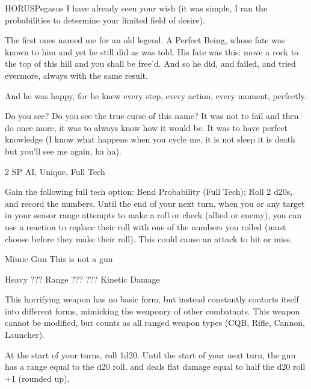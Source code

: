 \begin{mech}{HORUS}{Pegasus}
I have already seen your wish (it was simple, I ran the probabilities to determine your limited field of desire).

The first ones named me for an old legend. A Perfect Being, whose fate was known to him and yet he still did as was told. His fate was this: move a rock to the top of this hill and you shall be free'd. And so he did, and failed, and tried evermore, always with the same result.

And he was happy, for he knew every step, every action, every moment, perfectly.

Do you see? Do you see the true curse of this name? It was not to fail and then do once more, it was to always know how it would be. It was to have perfect knowledge (I know what happens when you cycle me, it is not sleep it is death but you'll see me again, ha ha).

2 SP
AI, Unique, Full Tech

Gain the following full tech option:
	Bend Probability (Full Tech): Roll 2 d20s, and record the numbers. Until the end of your next turn, when you or any target in your sensor range attempts to make a roll or check (allied or enemy), you can use a reaction to replace their roll with one of the numbers you rolled (must choose before they make their roll). This could cause an attack to hit or miss.

Mimic Gun
This is not a gun

Heavy ???
Range ???
??? Kinetic Damage

This horrifying weapon has no basic form, but instead constantly contorts itself into different forms, mimicking the weaponry of other combatants. This weapon cannot be modified, but counts as all ranged weapon types (CQB, Rifle, Cannon, Launcher).

At the start of your turns, roll 1d20. Until the start of your next turn, the gun has a range equal to the d20 roll, and deals flat damage equal to half the d20 roll +1 (rounded up).


\end{mech}
